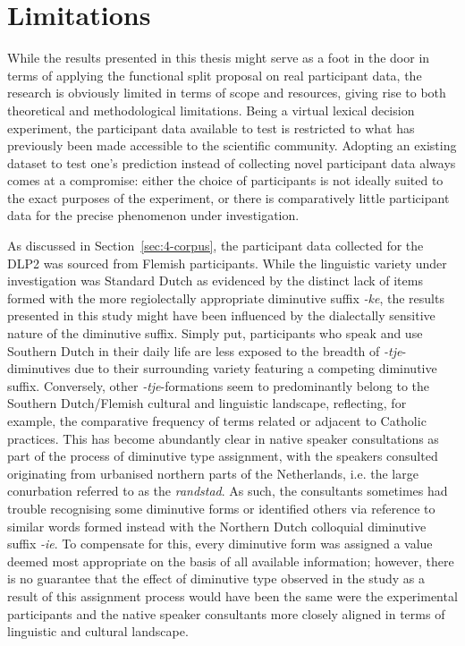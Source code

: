 \section{Limitations}
\label{sec:6-limits}
While the results presented in this thesis might serve as a foot in the door in terms of applying the functional split proposal on real participant data, the research is obviously limited in terms of scope and resources, giving rise to both theoretical and methodological limitations. Being a virtual lexical decision experiment, the participant data available to test is restricted to what has previously been made accessible to the scientific community. Adopting an existing dataset to test one's prediction instead of collecting novel participant data always comes at a compromise: either the choice of participants is not ideally suited to the exact purposes of the experiment, or there is comparatively little participant data for the precise phenomenon under investigation. 

As discussed in Section~\ref{sec:4-corpus}, the participant data collected for the DLP2 was sourced from Flemish participants. While the linguistic variety under investigation was Standard Dutch as evidenced by the distinct lack of items formed with the more regiolectally appropriate diminutive suffix \textit{-ke}, the results presented in this study might have been influenced by the dialectally sensitive nature of the diminutive suffix. Simply put, participants who speak and use Southern Dutch in their daily life are less exposed to the breadth of \textit{-tje}-diminutives due to their surrounding variety featuring a competing diminutive suffix. Conversely, other \textit{-tje}-formations seem to predominantly belong to the Southern Dutch/Flemish cultural and linguistic landscape, reflecting, for example, the comparative frequency of terms related or adjacent to Catholic practices. This has become abundantly clear in native speaker consultations as part of the process of diminutive type assignment, with the speakers consulted originating from urbanised northern parts of the Netherlands, i.e. the large conurbation referred to as the \textit{randstad}. As such, the consultants sometimes had trouble recognising some diminutive forms or identified others via reference to similar words formed instead with the Northern Dutch colloquial diminutive suffix \textit{-ie}. To compensate for this, every diminutive form was assigned a value deemed most appropriate on the basis of all available information; however, there is no guarantee that the effect of diminutive type observed in the study as a result of this assignment process would have been the same were the experimental participants and the native speaker consultants more closely aligned in terms of linguistic and cultural landscape.

